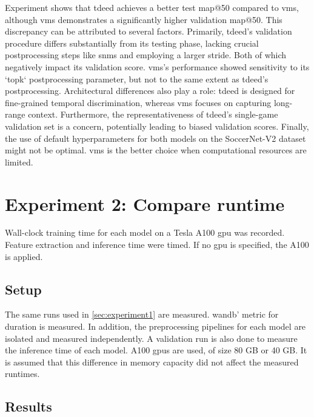 Experiment shows that \acrshort{tdeed} achieves a better test \acrshort{map}@50 compared to \acrshort{vms}, although \acrshort{vms} demonstrates a significantly higher validation \acrshort{map}@50. This discrepancy can be attributed to several factors. Primarily, \acrshort{tdeed}'s validation procedure differs substantially from its testing phase, lacking crucial postprocessing steps like \acrfull{snms} and employing a larger stride. Both of which negatively impact its validation score. \acrshort{vms}'s performance showed sensitivity to its `topk` postprocessing parameter, but not to the same extent as \acrshort{tdeed}'s postprocessing. Architectural differences also play a role: \acrshort{tdeed} is designed for fine-grained temporal discrimination, whereas \acrshort{vms} focuses on capturing long-range context. Furthermore, the representativeness of \acrshort{tdeed}'s single-game validation set is a concern, potentially leading to biased validation scores. Finally, the use of default hyperparameters for both models on the SoccerNet-V2 dataset might not be optimal. \acrshort{vms} is the better choice when computational resources are limited.

\section{Experiment 2: Compare runtime}
\label{sec:experiment2}

Wall-clock training time for each model on a Tesla A100 \acrshort{gpu} was recorded. Feature extraction and inference time were timed. If no \acrshort{gpu} is specified, the A100 is applied. 

\subsection{Setup}
\label{ssec:ex2_setup}

The same runs used in \autoref{sec:experiment1} are measured. \acrlong{wandb}' metric for duration is measured. In addition, the preprocessing pipelines for each model are isolated and measured independently. A validation run is also done to measure the inference time of each model. A100 \acrshort{gpu}s are used, of size 80 GB or 40 GB. It is assumed that this difference in memory capacity did not affect the measured runtimes. 

\subsection{Results}
\label{ssec:ex2_result}

